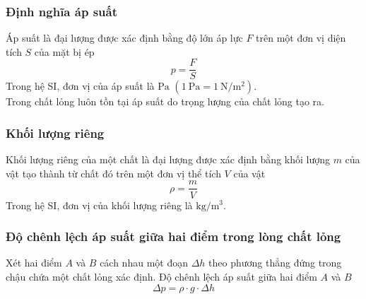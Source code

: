 \subsubsection{Định nghĩa áp suất}
Áp suất là đại lượng được xác định bằng độ lớn áp lực $F$ trên một đơn vị diện tích $S$ của mặt bị ép
$$p=\dfrac{F}{S}$$
Trong hệ SI, đơn vị của áp suất là $\si{\pascal}$ $\left(\SI{1}{\pascal}=\SI{1}{\newton/\meter^2}\right)$.\\
Trong chất lỏng luôn tồn tại áp suất do trọng lượng của chất lỏng tạo ra.
\subsubsection{Khối lượng riêng}
Khối lượng riêng của một chất là đại lượng được xác định bằng khối lượng $m$ của vật tạo thành từ chất đó trên một đơn vị thể tích $V$ của vật
$$\rho=\dfrac{m}{V}$$
Trong hệ SI, đơn vị của khối lượng riêng là $\si{\kilogram/\meter^3}$.
\subsubsection{Độ chênh lệch áp suất giữa hai điểm trong lòng chất lỏng}
Xét hai điểm $A$ và $B$ cách nhau một đoạn $\Delta h$ theo phương thẳng đứng trong chậu chứa một chất lỏng xác định. Độ chênh lệch áp suất giữa hai điểm $A$ và $B$
$$\Delta p=\rho \cdot g\cdot \Delta h$$
